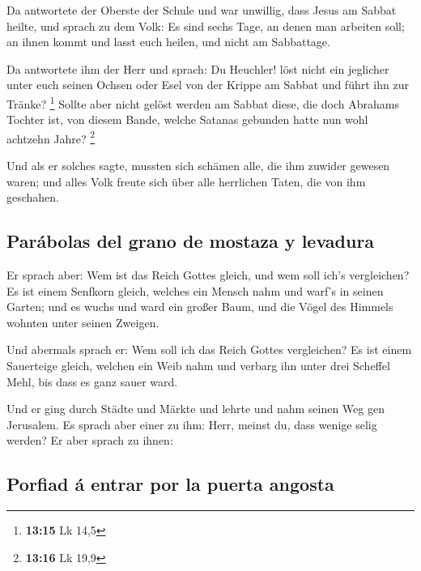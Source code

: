  Da antwortete der Oberste der Schule und war unwillig,
dass Jesus am Sabbat heilte, und sprach zu dem Volk: Es sind sechs Tage,
an denen man arbeiten soll; an ihnen kommt und lasst euch heilen, und
nicht am Sabbattage.

 Da antwortete ihm der Herr und sprach: Du Heuchler! löst
nicht ein jeglicher unter euch seinen Ochsen oder Esel von der Krippe am
Sabbat und führt ihn zur Tränke? \footnote{\textbf{13:15} Lk 14,5}
 Sollte aber nicht gelöst werden am Sabbat diese, die
doch Abrahams Tochter ist, von diesem Bande, welche Satanas gebunden
hatte nun wohl achtzehn Jahre? \footnote{\textbf{13:16} Lk 19,9}

 Und als er solches sagte, mussten sich schämen alle, die
ihm zuwider gewesen waren; und alles Volk freute sich über alle
herrlichen Taten, die von ihm geschahen.

\hypertarget{paruxe1bolas-del-grano-de-mostaza-y-levadura}{%
\subsection{Parábolas del grano de mostaza y
levadura}\label{paruxe1bolas-del-grano-de-mostaza-y-levadura}}

 Er sprach aber: Wem ist das Reich Gottes gleich, und wem
soll ich's vergleichen?  Es ist einem Senfkorn gleich,
welches ein Mensch nahm und warf's in seinen Garten; und es wuchs und
ward ein großer Baum, und die Vögel des Himmels wohnten unter seinen
Zweigen.

 Und abermals sprach er: Wem soll ich das Reich Gottes
vergleichen?  Es ist einem Sauerteige gleich, welchen ein
Weib nahm und verbarg ihn unter drei Scheffel Mehl, bis dass es ganz
sauer ward.

 Und er ging durch Städte und Märkte und lehrte und nahm
seinen Weg gen Jerusalem.  Es sprach aber einer zu ihm:
Herr, meinst du, dass wenige selig werden? Er aber sprach zu ihnen:

\hypertarget{porfiad-uxe1-entrar-por-la-puerta-angosta}{%
\subsection{Porfiad á entrar por la puerta
angosta}\label{porfiad-uxe1-entrar-por-la-puerta-angosta}}

